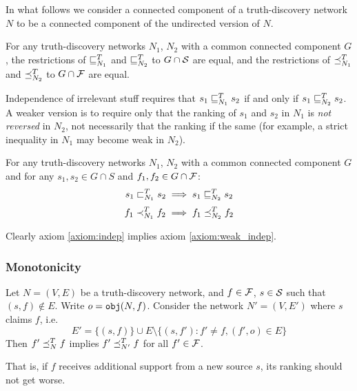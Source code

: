\documentclass[../main.tex]{subfiles}
\begin{document}
In what follows we consider a connected component of a truth-discovery network
$N$ to be a connected component of the undirected version of $N$.

\begin{axiom}
\label{axiom:indep}
For any truth-discovery networks $N_1$, $N_2$ with a common connected component
$G$, the restrictions of $\sle_{N_1}^T$ and $\sle_{N_2}^T$ to $G \cap \S$ are
equal, and the restrictions of $\fle_{N_1}^T$ and $\fle_{N_2}^T$ to $G \cap \F$
are equal.
\end{axiom}

Independence of irrelevant stuff requires that $s_1 \sle_{N_1}^T s_2$ if and
only if $s_1 \sle_{N_2}^T s_2$. A weaker version is to require only that the
ranking of $s_1$ and $s_2$ in $N_1$ is \emph{not reversed} in $N_2$, not
necessarily that the ranking if the same (for example, a strict inequality in
$N_1$ may become weak in $N_2$).

\begin{axiom}
\label{axiom:weak_indep}
For any truth-discovery networks $N_1$, $N_2$ with a common connected component
$G$ and for any $s_1, s_2 \in G \cap S$ and $f_1, f_2 \in G \cap \F$:
\[
    s_1 \slt_{N_1}^T s_2 \implies s_1 \sle_{N_2}^T s_2
\]
\[
    f_1 \flt_{N_1}^T f_2 \implies f_1 \fle_{N_2}^T f_2
\]
\end{axiom}

Clearly axiom \ref{axiom:indep} implies axiom \ref{axiom:weak_indep}.


\subsubsection{Monotonicity}


\begin{axiom}[Monotonicity]
Let $N = (V, E)$ be a truth-discovery network, and $f \in \F$, $s \in \S$ such
that $(s, f) \notin E$. Write $o = \obj(N, f)$. Consider the network $N'=(V,
E')$ where $s$ claims $f$, i.e.
$$
    E' = \{(s, f)\} \cup E \setminus \{(s, f') : f' \ne f, (f', o) \in E\}
$$
Then $f' \fle_N^T f$ implies $f' \fle_{N'}^T f$ for all $f' \in \F$.

That is, if $f$ receives additional support from a new source $s$, its ranking
should not get worse.
\end{axiom}
\end{document}
